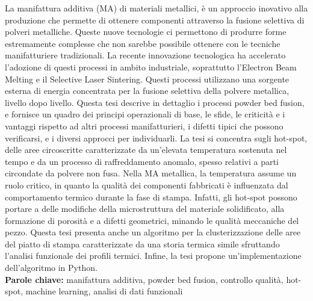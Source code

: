 La manifattura additiva (MA) di materiali metallici, è un approccio inovativo alla produzione che permette di ottenere componenti attraverso la fusione selettiva di polveri metalliche. Queste nuove tecnologie ci permettono di produrre forme estremamente complesse che non sarebbe possibile ottenere con le tecniche manifatturiere tradizionali. La recente innovazione tecnologica ha accelerato l'adozione di questi processi in ambito industriale, soprattutto l'Electron Beam Melting e il Selective Laser Sintering. Questi processi utilizzano una sorgente esterna di energia concentrata per la fusione selettiva della polvere metallica, livello dopo livello. Questa tesi descrive in dettaglio i processi powder bed fusion, e fornisce un quadro dei principi operazionali di base, le sfide, le criticità e i vantaggi rispetto ad altri processi manifatturieri, i difetti tipici che possono verificarsi, e i diversi approcci per individuarli. La tesi si concentra sugli hot-spot, delle aree circoscritte caratterizzate da un'elevata temperatura sostenuta nel tempo e da un processo di raffreddamento anomalo, spesso relativi a parti circondate da polvere non fusa. Nella MA metallica, la temperatura assume un ruolo critico, in quanto la qualità dei componenti fabbricati è influenzata dal comportamento termico durante la fase di stampa. Infatti, gli hot-spot possono portare a delle modifiche della microstruttura del materiale solidificato, alla formazione di porosità e a difetti geometrici, minando le qualità meccaniche del pezzo. Questa tesi presenta anche un algoritmo per la clusterizzazione delle aree del piatto di stampa caratterizzate da una storia termica simile sfruttando l'analisi funzionale dei profili termici. Infine, la tesi propone un'implementazione dell'algoritmo in Python.
\\[0.5cm]
\textbf{Parole chiave:} manifattura additiva, powder bed fusion, controllo qualità, hot-spot, machine learning, analisi di dati funzionali %

